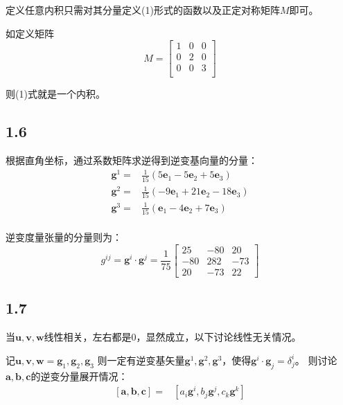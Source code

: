 \documentclass[UTF8,zihao=5]{ctexart}
\newcommand{\bm}[1]{{\mathbf{#1}}}
\begin{document}
定义任意内积只需对其分量定义(1)形式的函数以及正定对称矩阵$M$即可。

如定义矩阵
$$
M=\begin{bmatrix}
    1&0&0\\
    0&2&0\\
    0&0&3\\
\end{bmatrix}
$$

则(1)式就是一个内积。

\subsection*{1.6}
根据直角坐标，通过系数矩阵求逆得到逆变基向量的分量：
\begin{equation*}
    \begin{aligned}
        \bm{g}^1=&\frac{1}{15}(5\bm{e}_1-5\bm{e}_2+5\bm{e}_3)\\
        \bm{g}^2=&\frac{1}{15}(-9\bm{e}_1+21\bm{e}_2-18\bm{e}_3)\\
        \bm{g}^3=&\frac{1}{15}(\bm{e}_1-4\bm{e}_2+7\bm{e}_3)\\
    \end{aligned}
\end{equation*}

逆变度量张量的分量则为：
\begin{equation*}
    g^{ij}=\bm{g}^i\cdot\bm{g}^j=\frac{1}{75}\begin{bmatrix}
        25 & -80 & 20\\
        -80 & 282 & -73 \\
        20 & -73 & 22
    \end{bmatrix}
\end{equation*}



\subsection*{1.7}

当$\bm{u},\bm{v},\bm{w}$线性相关，左右都是0，显然成立，以下讨论线性无关情况。

记$\bm{u},\bm{v},\bm{w}=\bm{g}_1, \bm{g}_2, \bm{g}_3$
则一定有逆变基矢量$\bm{g}^1, \bm{g}^2, \bm{g}^3$，使得$\bm{g}^i\cdot\bm{g}_j=\delta^i_j$。
则讨论$\bm{a},\bm{b},\bm{c}$的逆变分量展开情况：
\begin{equation*}
    \begin{aligned}
        [\bm{a},\bm{b},\bm{c}]
        =&[a_i\bm{g}^i,b_j\bm{g}^j,c_k\bm{g}^k]\\
    \end{aligned}
\end{equation*}
\end{document}
